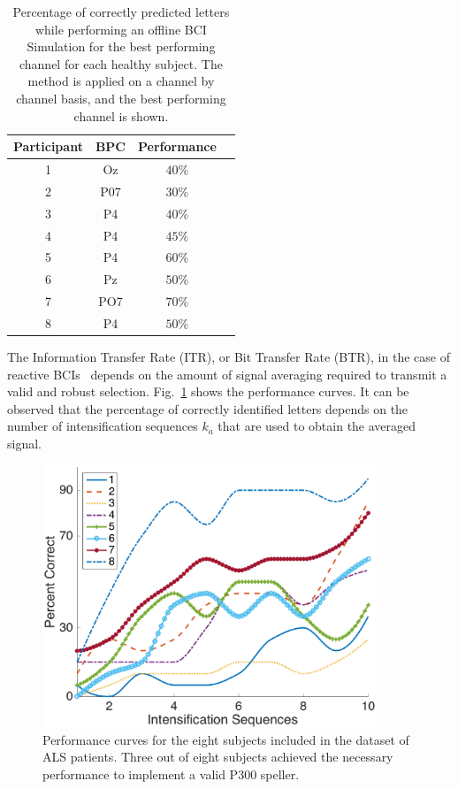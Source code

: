 \documentclass[entropy,article,submit,moreauthors,pdftex,10pt,a4paper]{mdpi}
\begin{document}
\begin{table}[H]
\caption{Percentage of correctly predicted letters while performing an offline BCI Simulation for the best performing channel for each healthy subject. The method is applied on a channel by channel basis, and the best performing channel is shown. }
\centering
\begin{tabular}{cccc}
\toprule
\textbf{Participant}	&  \textbf{BPC}	& \textbf{Performance}\\
\midrule
1     &     Oz   &     $40\%$  \\
2     &     P07   &     $30\%$ \\
3     &     P4   &     $40\%$ \\
4     &     P4   &     $45\%$ \\
5     &     P4   &      $60\%$ \\
6     &     Pz   &      $50\%$ \\
7     &     PO7   &      $70\%$ \\
8     &     P4   &      $50\%$ \\

\bottomrule
\end{tabular}
\label{tab:resultsowndataset}
\end{table}


The Information Transfer Rate (ITR), or Bit Transfer Rate (BTR), in the case of reactive BCIs~\citep{WolpawJonathanR2012}  depends on the amount of signal averaging required to transmit a valid and robust selection.  Fig.~\ref{fig:performance} shows the performance curves. It can be observed that the percentage of correctly identified letters depends on the number of intensification sequences $k_a$ that are used to obtain the averaged signal.


\begin{figure}[H]
\centering
\includegraphics[width=10cm]{performance.eps}
\caption{Performance curves for the eight subjects included in the dataset of ALS patients.  Three out of eight subjects achieved the necessary performance to implement a valid P300 speller.}
\label{fig:performance}
\end{figure}
\end{document}
